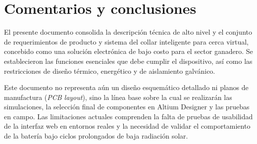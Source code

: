 \section*{\color{unalnavy}Comentarios y conclusiones}

El presente documento consolida la descripción técnica de alto nivel y el conjunto de requerimientos de producto y sistema del collar inteligente para cerca virtual, concebido como una solución electrónica de bajo costo para el sector ganadero. Se establecieron las funciones esenciales que debe cumplir el dispositivo, así como las restricciones de diseño térmico, energético y de aislamiento galvánico.

Este documento no representa aún un diseño esquemático detallado ni planos de manufactura (\textit{PCB layout}), sino la línea base sobre la cual se realizarán las simulaciones, la selección final de componentes en Altium Designer y las pruebas en campo. Las limitaciones actuales comprenden la falta de pruebas de usabilidad de la interfaz web en entornos reales y la necesidad de validar el comportamiento de la batería bajo ciclos prolongados de baja radiación solar.